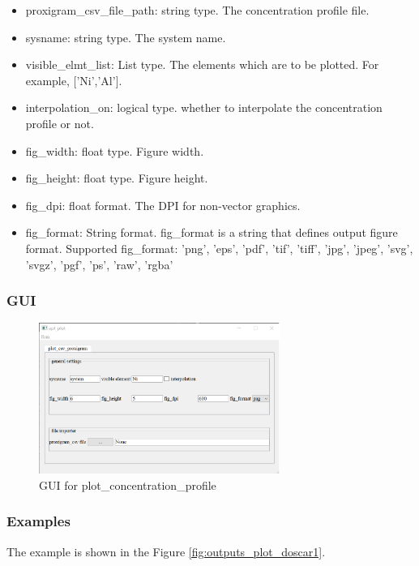 \documentclass[12pt]{book}
\begin{document}
\begin{itemize}
\item proxigram\_csv\_file\_path: string type. The concentration profile file.
\item sysname: string type. The system name.
\item visible\_elmt\_list: List type. The elements which are to be plotted. For example, ['Ni','Al'].
\item interpolation\_on: logical type. whether to interpolate the concentration profile or not.
\item fig\_width: float type. Figure width.
\item fig\_height: float type. Figure height.
\item fig\_dpi: float format. The DPI for non-vector graphics.
\item fig\_format: String format. fig\_format is a string that defines output figure format. Supported fig\_format: 'png', 'eps', 'pdf', 'tif', 'tiff', 'jpg', 'jpeg', 'svg', 'svgz', 'pgf', 'ps', 'raw', 'rgba'
\end{itemize}

\subsubsection{GUI}

\begin{figure}[htbp]
\centering
\includegraphics[width=0.7\textwidth]{gui_plot_concentration_profile.pdf}
\caption{GUI for plot\_concentration\_profile}
\label{fig:GUI_gui_plot_concentration_profile}
\end{figure}

\subsubsection{Examples}

The example is shown in the Figure \ref{fig:outputs_plot_doscar1}.
\end{document}
